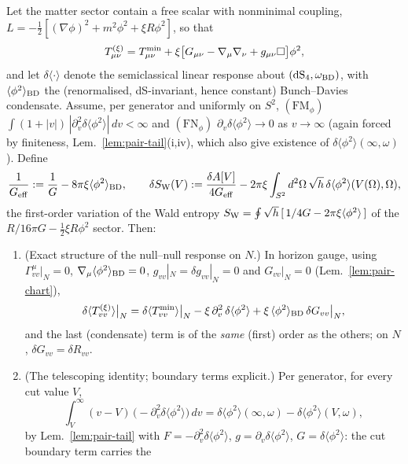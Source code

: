 \begin{lemma}
\label{lem:pair-improve}
Let the matter sector contain a free scalar with nonminimal coupling,
$L=-\tfrac12[(\nabla\phi)^{2}+m^{2}\phi^{2}+\xi R\phi^{2}]$, so that
\[
T^{(\xi)}_{\mu\nu}=T^{\rm min}_{\mu\nu}
+\xi\bigl[G_{\mu\nu}-\nabla_{\mu}\nabla_{\nu}
+g_{\mu\nu}\Box\bigr]\phi^{2},
\]
and let $\delta\langle\cdot\rangle$ denote the semiclassical linear
response about $(\mathrm{dS}_{4},\omega_{\rm BD})$, with
$\langle\phi^{2}\rangle_{\rm BD}$ the (renormalised, dS-invariant,
hence constant) Bunch--Davies condensate. Assume, per generator and
uniformly on $S^{2}$,
$(\mathrm{FM}_{\phi})$
$\int(1+|v|)\,|\partial_{v}^{2}\delta\langle\phi^{2}\rangle|\,dv
<\infty$ and $(\mathrm{FN}_{\phi})$
$\partial_{v}\delta\langle\phi^{2}\rangle\to0$ as $v\to\infty$ (again
forced by finiteness, Lem.~\ref{lem:pair-tail}(i,iv), which also give
existence of $\delta\langle\phi^{2}\rangle(\infty,\omega)$). Define
\[
\frac{1}{G_{\rm eff}}:=\frac{1}{G}
-8\pi\xi\langle\phi^{2}\rangle_{\rm BD},
\qquad
\delta S_{\rm W}(V):=\frac{\delta A[V]}{4G_{\rm eff}}
-2\pi\xi\int_{S^{2}}d^{2}\Omega\,\sqrt h\,
\delta\langle\phi^{2}\rangle(V(\Omega),\Omega),
\]
the first-order variation of the Wald entropy
$S_{\rm W}=\oint\sqrt h\,[\,1/4G-2\pi\xi\langle\phi^{2}\rangle\,]$ of
the $R/16\pi G-\tfrac12\xi R\phi^{2}$ sector. Then:
\begin{enumerate}
\item[(I)] (Exact structure of the null--null response on $N$.) In
horizon gauge, using $\Gamma^{\mu}_{vv}|_{N}=0$,
$\nabla_{\mu}\langle\phi^{2}\rangle_{\rm BD}=0$,
$g_{vv}|_{N}=\delta g_{vv}|_{N}=0$ and $G_{vv}|_{N}=0$
(Lem.~\ref{lem:pair-chart}),
\[
\delta\langle T^{(\xi)}_{vv}\rangle\big|_{N}
=\delta\langle T^{\rm min}_{vv}\rangle\big|_{N}
-\xi\,\partial_{v}^{2}\,\delta\langle\phi^{2}\rangle
+\xi\,\langle\phi^{2}\rangle_{\rm BD}\,\delta G_{vv}\big|_{N},
\]
and the last (condensate) term is of the \emph{same} (first) order as
the others; on $N$, $\delta G_{vv}=\delta R_{vv}$.
\item[(II)] (The telescoping identity; boundary terms explicit.)
Per generator, for every cut value $V$,
\[
\int_{V}^{\infty}(v-V)\,\bigl(-\partial_{v}^{2}
\delta\langle\phi^{2}\rangle\bigr)\,dv
=\delta\langle\phi^{2}\rangle(\infty,\omega)
-\delta\langle\phi^{2}\rangle(V,\omega),
\]
by Lem.~\ref{lem:pair-tail} with
$F=-\partial_{v}^{2}\delta\langle\phi^{2}\rangle$,
$g=\partial_{v}\delta\langle\phi^{2}\rangle$,
$G=\delta\langle\phi^{2}\rangle$: the cut boundary term carries the

\end{enumerate}
\end{lemma}

